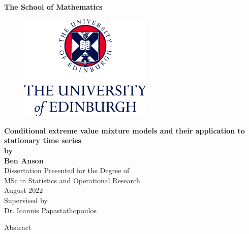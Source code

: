 \documentclass[11pt,twoside,openany]{book}
\numberwithin{Theorem}{chapter}
\numberwithin{Definition}{chapter}
\numberwithin{Lemma}{chapter}
\numberwithin{Algorithm}{chapter}
\numberwithin{equation}{chapter}
\begin{document}
\pagestyle{empty}

\begin{titlepage}
\vspace*{.5em}
\center
\textbf{\large{The School of Mathematics}} \\
\vspace*{1em}
\begin{figure}[!h]
\centering
\includegraphics[width=180pt]{CentredLogoCMYK.jpg}
\end{figure}
\vspace{2em}
\textbf{\Huge{Conditional extreme value mixture models and their application
to stationary time series}}\\[2em]
\textbf{\LARGE{by}}\\
\vspace{2em}
\textbf{\LARGE{Ben Anson}}\\
\vspace{6.5em}
\Large{Dissertation Presented for the Degree of\\
MSc in Statistics and Operational Research}\\
\vspace{6.5em}
\Large{August 2022}\\
\vspace{3em}
\Large{Supervised by\\Dr. Ioannis Papastathopoulos}
\vfill
\end{titlepage}

\cleardoublepage


\begin{center}
\Large{Abstract}
\end{center}
\end{document}
